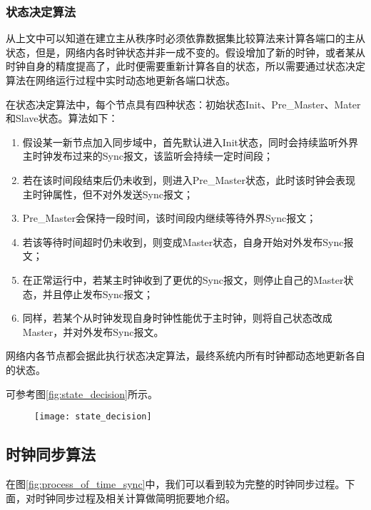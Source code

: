 \subsubsection{状态决定算法}
从上文中可以知道在建立主从秩序时必须依靠数据集比较算法来计算各端口的主从状态，但是，网络内各时钟状态并非一成不变的。假设增加了新的时钟，或者某从时钟自身的精度提高了，此时便需要重新计算各自的状态，所以需要通过状态决定算法在网络运行过程中实时动态地更新各端口状态。

在状态决定算法中，每个节点具有四种状态：初始状态Init、Pre\_Master、Mater和Slave状态。算法如下：
\begin{enumerate}[noitemsep,topsep=0pt,parsep=0pt,partopsep=0pt]
	\item 假设某一新节点加入同步域中，首先默认进入Init状态，同时会持续监听外界主时钟发布过来的Sync报文，该监听会持续一定时间段；
	\item 若在该时间段结束后仍未收到，则进入Pre\_Master状态，此时该时钟会表现主时钟属性，但不对外发送Sync报文；
	\item Pre\_Master会保持一段时间，该时间段内继续等待外界Sync报文；
	\item 若该等待时间超时仍未收到，则变成Master状态，自身开始对外发布Sync报文；
	\item 在正常运行中，若某主时钟收到了更优的Sync报文，则停止自己的Master状态，并且停止发布Sync报文；
	\item 同样，若某个从时钟发现自身时钟性能优于主时钟，则将自己状态改成Master，并对外发布Sync报文。
\end{enumerate}

网络内各节点都会据此执行状态决定算法，最终系统内所有时钟都动态地更新各自的状态。

可参考图\ref{fig:state_decision}所示。

\begin{figure}[!hbp]
  \centering
  \begin{minipage}[b]{0.8\textwidth}
    \captionstyle{\centering}
    \centering
    \texttt{[image: state\_decision]}
  \end{minipage}     
\end{figure}

\subsection{时钟同步算法}
\label{sec:1588_theory_sync}
在图\ref{fig:process_of_time_sync}中，我们可以看到较为完整的时钟同步过程。下面，对时钟同步过程及相关计算做简明扼要地介绍。

